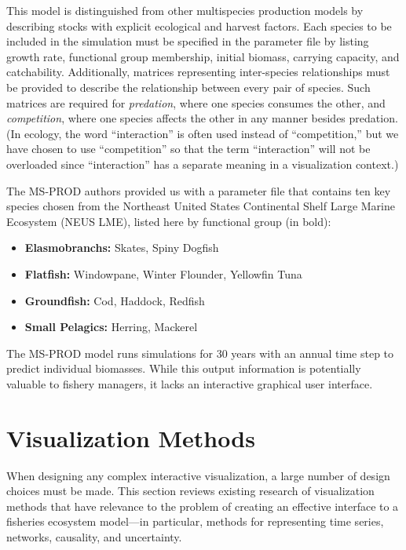 This model is distinguished from other multispecies production models by describing stocks with explicit ecological and harvest factors.  Each species to be included in the simulation must be specified in the parameter file by listing growth rate, functional group membership, initial biomass, carrying capacity, and catchability.  Additionally, matrices representing inter-species relationships must be provided to describe the relationship between every pair of species.  Such matrices are required for \textit{predation}, where one species consumes the other, and \textit{competition}, where one species affects the other in any manner besides predation.  (In ecology, the word ``interaction'' is often used instead of ``competition,'' but we have chosen to use ``competition'' so that the term ``interaction'' will not be overloaded since ``interaction'' has a separate meaning in a visualization context.)

The MS-PROD authors provided us with a parameter file that contains ten key species chosen from the Northeast United States Continental Shelf Large Marine Ecosystem (NEUS LME), listed here by functional group (in bold):
\begin{itemize}
	\item \textbf{Elasmobranchs:} Skates, Spiny Dogfish
	\item \textbf{Flatfish:} Windowpane, Winter Flounder, Yellowfin Tuna
	\item \textbf{Groundfish:} Cod, Haddock, Redfish
	\item \textbf{Small Pelagics:} 	Herring, Mackerel
\end{itemize}
The MS-PROD model runs simulations for 30 years with an annual time step to predict individual biomasses.  While this output information is potentially valuable to fishery managers, it lacks an interactive graphical user interface.  

\section{Visualization Methods}

When designing any complex interactive visualization, a large number of design choices must be made.  This section reviews existing research of visualization methods that have relevance to the problem of creating an effective interface to a fisheries ecosystem model---in particular, methods for representing time series, networks, causality, and uncertainty.

